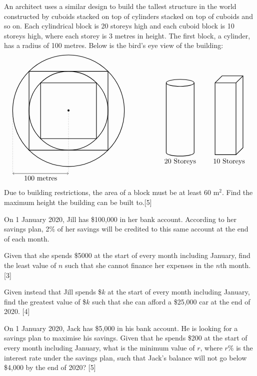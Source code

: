 \documentclass[12pt, a4 paper]{article}
\begin{document}
\begin{outline}[enumerate]
  \2 An architect uses a similar design to build the tallest structure in the world constructed by cuboids stacked on top of cylinders stacked on top of cuboids and so on. Each cylindrical block is 20 storeys high and each cuboid block is 10 storeys high, where each storey is 3 metres in height. The first block, a cylinder, has a radius of 100 metres. Below is the bird's eye view of the building:
  \[
  \begin{tikzpicture}
    \draw[<->] (-80pt,-90pt) -- (-40pt,-90pt)node[below]{100 metres} -- (0,-90pt);
    \draw[dotted] (-80pt,-90pt) -- (-80pt,0);
    \draw[dotted] (0pt,-90pt) -- (0,0);
    \draw[thick] (0,0) circle (80pt);
    \draw[thick] (56.5685pt,56.5685pt) -- (-56.5685pt,56.5685pt) --(-56.5685pt,-56.5685pt) -- (56.5685pt,-56.5685pt) -- cycle;
    \draw[thick] (0,0) circle (56.5685pt);
    \draw[thick] (40pt,40pt) -- (-40pt,40pt) --(-40pt,-40pt) -- (40pt,-40pt) -- cycle;
    \draw[thick] (160pt,40pt) ellipse (20pt and 5pt);
    \draw[thick] (140pt,40pt) -- (140pt,-60pt) arc (180:360:20pt and 5pt) -- (180pt,40pt);
    \draw[thick] (210pt,40pt) rectangle (240pt,-63pt);
    \draw[thick] (210pt,40pt) -- (220pt,50pt) -- (250pt,50pt) -- (250pt,-53pt) -- (240pt,-63pt);
    \draw[thick] (250pt,50pt) -- (240pt,40pt);
    \draw (160pt,-65pt) node[below]{20 Storeys};
    \draw (230pt,-65pt) node[below]{10 Storeys};
    \node at (0,0) {\textbullet};
  \end{tikzpicture}
  \]
  Due to building restrictions, the area of a block must be at least 60 m\(^2\). Find the maximum height the building can be built to.\hfill[5]

\1 On 1 January 2020, Jill has \$100,000 in her bank account. According to her savings plan, 2\% of her savings will be credited to this same account at the end of each month. %

  \2 Given that she spends \$5000 at the start of every month including January, find the least value of \(n\) such that she cannot finance her expenses in the \(n\)th month.\hfill[3]

  \2 Given instead that Jill spends \$\(k\) at the start of every month including January, find the greatest value of \$\(k\) such that she can afford a \$25,000 car at the end of 2020. \hfill[4]

\1 On 1 January 2020, Jack has \$5,000 in his bank account. He is looking for a savings plan to maximise his savings. Given that he spends \$200 at the start of every month including January, what is the minimum value of \(r\), where \(r\)\% is the interest rate under the savings plan, such that Jack's balance will not go below \$4,000 by the end of 2020? \hfill[5]

\end{outline}
\end{document}
